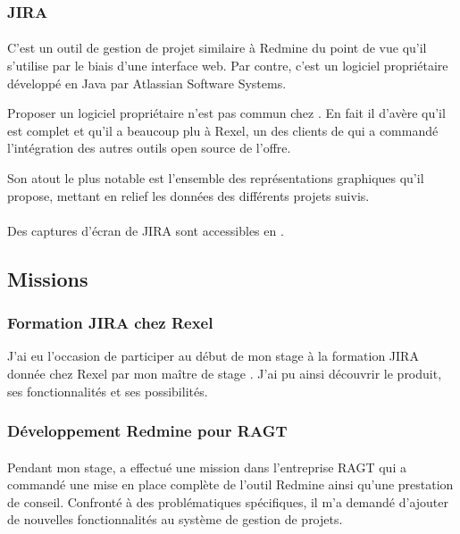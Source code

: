 \subsubsection{JIRA}

\paragraph{}
C'est un outil de gestion de projet similaire à Redmine du point de vue qu'il s'utilise par le biais d'une interface web.
Par contre, c'est un logiciel propriétaire développé en Java par Atlassian Software Systems.

Proposer un logiciel propriétaire n'est pas commun chez \asmile.
En fait il d'avère qu'il est complet et qu'il a beaucoup plu à Rexel, un des clients de \asmile{} qui a commandé l'intégration des autres outils open source de l'offre.

Son atout le plus notable est l'ensemble des représentations graphiques qu'il propose, mettant en relief les données des différents projets suivis.

\paragraph{}
Des captures d'écran de JIRA sont accessibles en .



\subsection{Missions}

\subsubsection{Formation JIRA chez Rexel}

J'ai eu l'occasion de participer au début de mon stage à la formation JIRA donnée chez Rexel par mon maître de stage \agulet.
J'ai pu ainsi découvrir le produit, ses fonctionnalités et ses possibilités.



\subsubsection{Développement Redmine pour RAGT}

\paragraph{}
Pendant mon stage, \agulet{} a effectué une mission dans l'entreprise RAGT qui a commandé une mise en place complète de l'outil Redmine ainsi qu'une prestation de conseil.
Confronté à des problématiques spécifiques, il m'a demandé d'ajouter de nouvelles fonctionnalités au système de gestion de projets.


